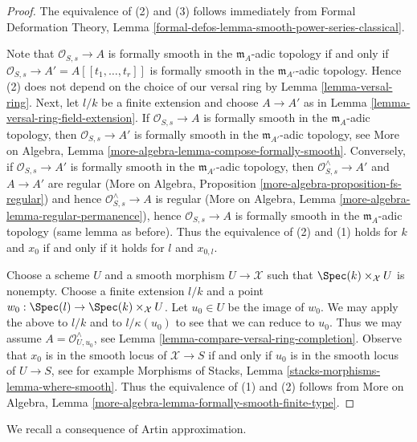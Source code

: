 \begin{proof}
The equivalence of (2) and (3) follows immediately from
Formal Deformation Theory, Lemma
\ref{formal-defos-lemma-smooth-power-series-classical}.

\medskip\noindent
Note that $\mathcal{O}_{S, s} \to A$ is formally smooth in the
$\mathfrak m_A$-adic topology if and only if
$\mathcal{O}_{S, s} \to A' = A[[t_1, \ldots, t_r]]$
is formally smooth in the $\mathfrak m_{A'}$-adic topology.
Hence (2) does not depend on the choice
of our versal ring by Lemma \ref{lemma-versal-ring}.
Next, let $l/k$ be a finite extension and choose
$A \to A'$ as in Lemma \ref{lemma-versal-ring-field-extension}.
If $\mathcal{O}_{S, s} \to A$ is formally smooth in the
$\mathfrak m_A$-adic topology, then $\mathcal{O}_{S, s} \to A'$
is formally smooth in the $\mathfrak m_{A'}$-adic topology, see
More on Algebra, Lemma \ref{more-algebra-lemma-compose-formally-smooth}.
Conversely, if $\mathcal{O}_{S, s} \to A'$
is formally smooth in the $\mathfrak m_{A'}$-adic topology,
then $\mathcal{O}_{S, s}^\wedge \to A'$ and $A \to A'$ are regular
(More on Algebra, Proposition \ref{more-algebra-proposition-fs-regular})
and hence $\mathcal{O}_{S, s}^\wedge \to A$ is regular
(More on Algebra, Lemma \ref{more-algebra-lemma-regular-permanence}),
hence $\mathcal{O}_{S, s} \to A$ is formally smooth in the
$\mathfrak m_A$-adic topology (same lemma as before).
Thus the equivalence of (2) and (1) holds for
$k$ and $x_0$ if and only if it holds for $l$ and $x_{0, l}$.

\medskip\noindent
Choose a scheme $U$ and a smooth morphism $U \to \mathcal{X}$ such
that $\Spec(k) \times_\mathcal{X} U$ is nonempty. Choose a finite
extension $l/k$ and a point $w_0 : \Spec(l) \to \Spec(k) \times_\mathcal{X} U$.
Let $u_0 \in U$ be the image of $w_0$.
We may apply the above to $l/k$ and to $l/\kappa(u_0)$
to see that we can reduce to $u_0$. Thus we may assume
$A = \mathcal{O}_{U, u_0}^\wedge$, see
Lemma \ref{lemma-compare-versal-ring-completion}.
Observe that $x_0$ is in the smooth locus of $\mathcal{X} \to S$
if and only if $u_0$ is in the smooth locus of $U \to S$, see for example
Morphisms of Stacks, Lemma \ref{stacks-morphisms-lemma-where-smooth}.
Thus the equivalence of (1) and (2) follows from
More on Algebra, Lemma \ref{more-algebra-lemma-formally-smooth-finite-type}.
\end{proof}

\noindent
We recall a consequence of Artin approximation.

